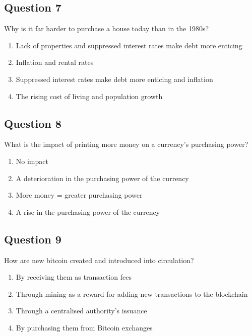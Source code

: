 \documentclass[12pt,a4paper]{article}
\begin{document}
\bigskip


\subsection*{Question 7}
Why is it far harder to purchase a house today than in the 1980s?

\begin{enumerate}[label=\Alph*., leftmargin=*]
\item Lack of properties and suppressed interest rates make debt more enticing
\item Inflation and rental rates
\item Suppressed interest rates make debt more enticing and inflation
\item The rising cost of living and population growth
\end{enumerate}

\bigskip


\subsection*{Question 8}
What is the impact of printing more money on a currency's purchasing power?

\begin{enumerate}[label=\Alph*., leftmargin=*]
\item No impact
\item A deterioration in the purchasing power of the currency
\item More money = greater purchasing power
\item A rise in the purchasing power of the currency
\end{enumerate}

\bigskip


\subsection*{Question 9}
How are new bitcoin created and introduced into circulation?

\begin{enumerate}[label=\Alph*., leftmargin=*]
\item By receiving them as transaction fees
\item Through mining as a reward for adding new transactions to the blockchain
\item Through a centralised authority's issuance
\item By purchasing them from Bitcoin exchanges
\end{enumerate}
\end{document}
